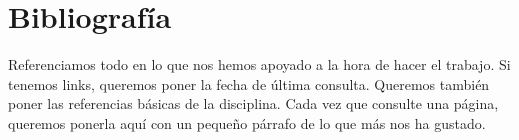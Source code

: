 \section{Bibliografía}
Referenciamos todo en lo que nos hemos apoyado a la hora de hacer el trabajo. Si tenemos links, queremos poner la fecha de última consulta.
Queremos también poner las referencias básicas de la disciplina. Cada vez que consulte una página, queremos ponerla aquí con un pequeño párrafo de lo que más nos ha gustado.
